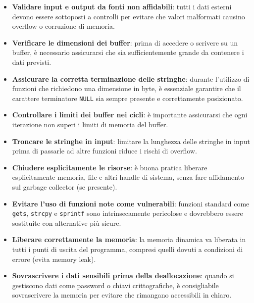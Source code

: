 \begin{itemize}
  \item \textbf{Validare input e output da fonti non affidabili}: tutti i dati esterni
    devono essere sottoposti a controlli per evitare che valori malformati causino
    overflow o corruzione di memoria.

  \item \textbf{Verificare le dimensioni dei buffer}: prima di accedere o scrivere
    su un buffer, è necessario assicurarsi che sia sufficientemente grande da
    contenere i dati previsti.

  \item \textbf{Assicurare la corretta terminazione delle stringhe}: durante l'utilizzo
    di funzioni che richiedono una dimensione in byte, è essenziale garantire
    che il carattere terminatore \texttt{NULL} sia sempre presente e correttamente
    posizionato.

  \item \textbf{Controllare i limiti dei buffer nei cicli}: è importante assicurarsi
    che ogni iterazione non superi i limiti di memoria del buffer.

  \item \textbf{Troncare le stringhe in input}: limitare la lunghezza delle stringhe
    in input prima di passarle ad altre funzioni riduce i rischi di overflow.

  \item \textbf{Chiudere esplicitamente le risorse}: è buona pratica liberare esplicitamente
    memoria, file e altri handle di sistema, senza fare affidamento sul garbage collector
    (se presente).

  \item \textbf{Evitare l'uso di funzioni note come vulnerabili}: funzioni standard
    come \texttt{gets}, \texttt{strcpy} e \texttt{sprintf} sono intrinsecamente pericolose
    e dovrebbero essere sostituite con alternative più sicure.

  \item \textbf{Liberare correttamente la memoria}: la memoria dinamica va liberata
    in tutti i punti di uscita del programma, compresi quelli dovuti a
    condizioni di errore (evita memory leak).

  \item \textbf{Sovrascrivere i dati sensibili prima della deallocazione}: quando
    si gestiscono dati come password o chiavi crittografiche, è consigliabile
    sovrascrivere la memoria per evitare che rimangano accessibili in chiaro.
\end{itemize}


